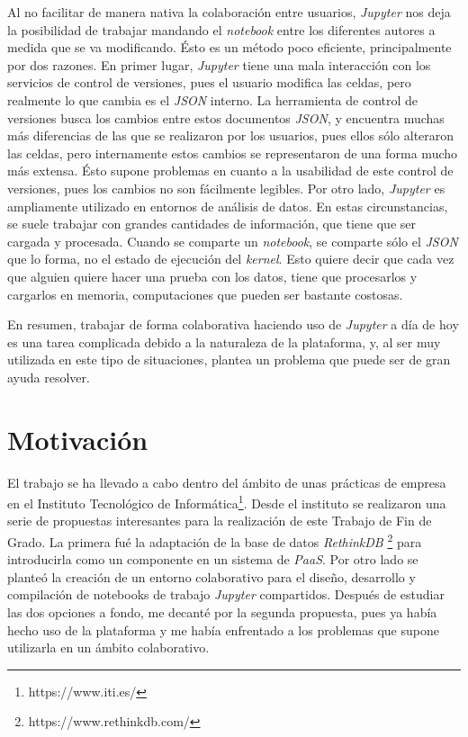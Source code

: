 \documentclass[11pt,spanish,listoffigures]{tfgetsinf}
\begin{document}
Al no facilitar de manera nativa la colaboración entre usuarios, \textit{Jupyter} nos deja la posibilidad de trabajar mandando el \textit{notebook} entre los diferentes autores a medida que se va modificando. Ésto es un método poco eficiente, principalmente por dos razones. En primer lugar, \textit{Jupyter} tiene una mala interacción con los servicios de control de versiones, pues el usuario modifica las celdas, pero realmente lo que cambia es el \textit{JSON} interno. La herramienta de control de versiones busca los cambios entre estos documentos \textit{JSON}, y encuentra muchas más diferencias de las que se realizaron por los usuarios, pues ellos sólo alteraron las celdas, pero internamente estos cambios se representaron de una forma mucho más extensa. Ésto supone problemas en cuanto a la usabilidad de este control de versiones, pues los cambios no son fácilmente legibles. 
Por otro lado, \textit{Jupyter} es ampliamente utilizado en entornos de análisis de datos. En estas circunstancias, se suele trabajar con grandes cantidades de información, que tiene que ser cargada y procesada. Cuando se comparte un \textit{notebook}, se comparte sólo el \textit{JSON} que lo forma, no el estado de ejecución del \textit{kernel}. Esto quiere decir que cada vez que alguien quiere hacer una prueba con los datos, tiene que procesarlos y cargarlos en memoria, computaciones que pueden ser bastante costosas.

En resumen, trabajar de forma colaborativa haciendo uso de \textit{Jupyter} a día de hoy es una tarea complicada debido a la naturaleza de la plataforma, y, al ser muy utilizada en este tipo de situaciones, plantea un problema que puede ser de gran ayuda resolver.



\section{Motivaci\'on}
\label{sec:motivacion}

El trabajo se ha llevado a cabo dentro del ámbito de unas prácticas de empresa en el Instituto Tecnológico de Informática\footnote{https://www.iti.es/}. Desde el instituto se realizaron una serie de propuestas interesantes para la realización de este Trabajo de Fin de Grado. La primera fué la adaptación de la base de datos \textit{RethinkDB} \footnote{https://www.rethinkdb.com/} para introducirla como un componente en un sistema de \textit{PaaS}. Por otro lado se planteó la creación de un entorno colaborativo para el diseño, desarrollo y compilación de notebooks de trabajo \textit{Jupyter} compartidos. Después de estudiar las dos opciones a fondo, me decanté por la segunda propuesta, pues ya había hecho uso de la plataforma y me había enfrentado a los problemas que supone utilizarla en un ámbito colaborativo.
\end{document}
